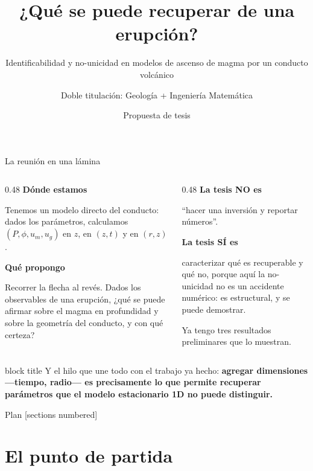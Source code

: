 \documentclass[aspectratio=169,10pt,t]{beamer}
\title{¿Qué se puede recuperar de una erupción?}
\subtitle{Identificabilidad y no-unicidad en modelos de ascenso de magma por un conducto volcánico}
\date{Propuesta de tesis}
\author{Doble titulación: Geología + Ingeniería Matemática}
\institute{Caso de estudio: Calbuco, abril de 2015}
\newcommand{\mensaje}[1]{%
  \vfill
  \begin{beamercolorbox}[wd=\linewidth,sep=0.4em,rounded=true]{block title}
  \footnotesize #1
  \end{beamercolorbox}}
\begin{document}
\maketitle

\begin{frame}{La reunión en una lámina}

\begin{columns}[T]
\begin{column}{0.48\textwidth}
\textbf{Dónde estamos}\medskip

Tenemos un modelo directo del conducto: dados los parámetros, calculamos
$(P,\phi,u_m,u_g)$ en $z$, en $(z,t)$ y en $(r,z)$.

\bigskip
\textbf{Qué propongo}\medskip

Recorrer la flecha al revés. Dados los observables de una erupción,
\alert{¿qué se puede afirmar sobre el magma en profundidad y sobre la geometría
del conducto, y con qué certeza?}
\end{column}

\begin{column}{0.48\textwidth}
\textbf{La tesis NO es}\medskip

``hacer una inversión y reportar números''.

\bigskip
\textbf{La tesis SÍ es}\medskip

caracterizar \alert{qué es recuperable y qué no}, porque aquí la no-unicidad no
es un accidente numérico: es \alert{estructural}, y se puede demostrar.

\bigskip
Ya tengo tres resultados preliminares que lo muestran.
\end{column}
\end{columns}

\mensaje{Y el hilo que une todo con el trabajo ya hecho: \textbf{agregar
dimensiones —tiempo, radio— es precisamente lo que permite recuperar parámetros
que el modelo estacionario 1D no puede distinguir.}}
\end{frame}

\begin{frame}{Plan}
[sections numbered]
{\small\tableofcontents[hideallsubsections]}
\end{frame}

\section{El punto de partida}
\end{document}
